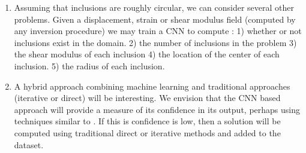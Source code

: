 \documentclass[12pt]{article}
\begin{document}
\begin{enumerate}
\item{Assuming that inclusions are roughly circular, we can consider several other problems. Given a displacement, strain or shear modulus field (computed by any inversion procedure) we may train a CNN to compute : 1) whether or not inclusions exist in the domain. 2) the number of inclusions in the problem 3) the shear modulus of each inclusion 4) the location of the center of each inclusion. 5) the radius of each inclusion.}
\item{A hybrid approach combining machine learning and traditional approaches (iterative or direct) will be interesting. We envision that the CNN based approach will provide a measure of its confidence in its output, perhaps using techniques similar to \cite{paper:patel2021}. If this is confidence is low, then a solution will be computed using traditional direct or iterative methods and added to the dataset.}

\end{enumerate}
\end{document}
